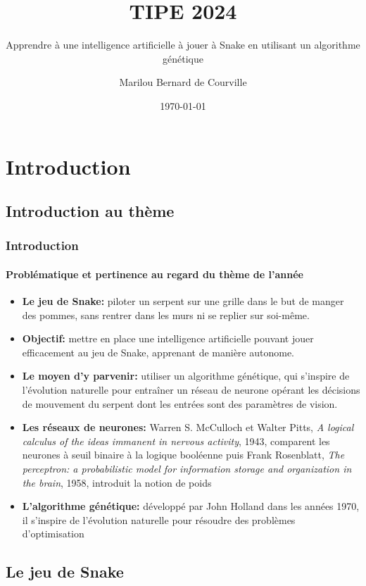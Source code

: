 \documentclass[10pt]{beamer}
\title{TIPE 2024}
\subtitle{Apprendre à une intelligence artificielle à jouer à Snake en utilisant un algorithme génétique}
\author{Marilou Bernard de Courville}
\institute{N\textsuperscript{\underline{o}} SCEI 40091}
\date{\today}
\begin{document}
\begin{frame}
    \titlepage
\end{frame}


\section{Introduction}

\subsection{Introduction au thème}

\begin{frame}
\frametitle{Introduction}
\framesubtitle{Problématique et pertinence au regard du thème de l'année}
\small
\begin{itemize}
\item \textbf{Le jeu de Snake:} piloter un serpent sur une grille dans le but de
manger des pommes, sans rentrer dans les murs ni se replier sur
soi-même.
\item \textbf{Objectif:} mettre en place une intelligence
artificielle pouvant jouer efficacement au jeu de Snake, apprenant de manière autonome.
\item \textbf{Le moyen d'y parvenir:} utiliser un algorithme génétique,
qui s'inspire de l'évolution naturelle pour entraîner un réseau de neurone opérant les décisions de mouvement
du serpent dont les entrées sont des paramètres de vision.
\item \textbf{Les réseaux de neurones:} Warren S. McCulloch et Walter Pitts, {\footnotesize \textit{A logical calculus of the ideas immanent in nervous activity}}, 1943, comparent les neurones à seuil binaire à la logique booléenne puis Frank Rosenblatt, {\footnotesize \textit{The perceptron: a probabilistic model for information storage and organization in the brain}}, 1958, introduit la notion de poids
\item \textbf{L'algorithme génétique:} développé par John Holland dans les années 1970, il s'inspire de l'évolution naturelle pour résoudre des problèmes d'optimisation
\end{itemize}
\end{frame}

\subsection{Le jeu de Snake}
\end{document}
